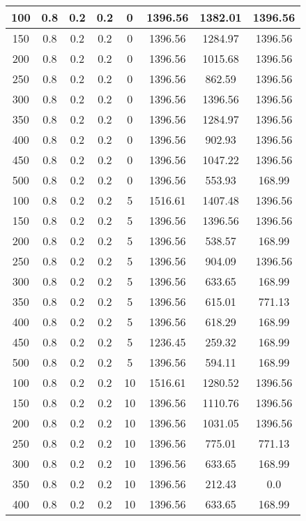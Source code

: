 \documentclass[a4paper, 12pt]{extreport}
\begin{document}
\begin{itemize}
\begin{longtable}{|c|c|c|c|c|c|c|c|}
			100 & 0.8 & 0.2 & 0.2 & 0 & 1396.56 & 1382.01 & 1396.56 \\\hline
			150 & 0.8 & 0.2 & 0.2 & 0 & 1396.56 & 1284.97 & 1396.56 \\\hline
			200 & 0.8 & 0.2 & 0.2 & 0 & 1396.56 & 1015.68 & 1396.56 \\\hline
			250 & 0.8 & 0.2 & 0.2 & 0 & 1396.56 & 862.59 & 1396.56 \\\hline
			300 & 0.8 & 0.2 & 0.2 & 0 & 1396.56 & 1396.56 & 1396.56 \\\hline
			350 & 0.8 & 0.2 & 0.2 & 0 & 1396.56 & 1284.97 & 1396.56 \\\hline
			400 & 0.8 & 0.2 & 0.2 & 0 & 1396.56 & 902.93 & 1396.56 \\\hline
			450 & 0.8 & 0.2 & 0.2 & 0 & 1396.56 & 1047.22 & 1396.56 \\\hline
			500 & 0.8 & 0.2 & 0.2 & 0 & 1396.56 & 553.93 & 168.99 \\\hline
			100 & 0.8 & 0.2 & 0.2 & 5 & 1516.61 & 1407.48 & 1396.56 \\\hline
			150 & 0.8 & 0.2 & 0.2 & 5 & 1396.56 & 1396.56 & 1396.56 \\\hline
			200 & 0.8 & 0.2 & 0.2 & 5 & 1396.56 & 538.57 & 168.99 \\\hline
			250 & 0.8 & 0.2 & 0.2 & 5 & 1396.56 & 904.09 & 1396.56 \\\hline
			300 & 0.8 & 0.2 & 0.2 & 5 & 1396.56 & 633.65 & 168.99 \\\hline
			350 & 0.8 & 0.2 & 0.2 & 5 & 1396.56 & 615.01 & 771.13 \\\hline
			400 & 0.8 & 0.2 & 0.2 & 5 & 1396.56 & 618.29 & 168.99 \\\hline
			450 & 0.8 & 0.2 & 0.2 & 5 & 1236.45 & 259.32 & 168.99 \\\hline
			500 & 0.8 & 0.2 & 0.2 & 5 & 1396.56 & 594.11 & 168.99 \\\hline
			100 & 0.8 & 0.2 & 0.2 & 10 & 1516.61 & 1280.52 & 1396.56 \\\hline
			150 & 0.8 & 0.2 & 0.2 & 10 & 1396.56 & 1110.76 & 1396.56 \\\hline
			200 & 0.8 & 0.2 & 0.2 & 10 & 1396.56 & 1031.05 & 1396.56 \\\hline
			250 & 0.8 & 0.2 & 0.2 & 10 & 1396.56 & 775.01 & 771.13 \\\hline
			300 & 0.8 & 0.2 & 0.2 & 10 & 1396.56 & 633.65 & 168.99 \\\hline
			350 & 0.8 & 0.2 & 0.2 & 10 & 1396.56 & 212.43 & 0.0 \\\hline
			400 & 0.8 & 0.2 & 0.2 & 10 & 1396.56 & 633.65 & 168.99 \\\hline

\end{longtable}
\end{itemize}
\end{document}

